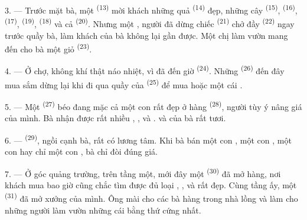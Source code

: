 3. --- Trước mặt bà, một  \textsuperscript{(13)} mời khách những quả
 \textsuperscript{(14)} đẹp, những cây 
\textsuperscript{(15)},  \textsuperscript{(16)}, 
\textsuperscript{(17)},  \textsuperscript{(19)}, 
\textsuperscript{(18)} và cả  \textsuperscript{(20)}. Nhưng một , người đã dừng chiếc  \textsuperscript{(21)} chở đầy
 \textsuperscript{(22)} ngay trước quầy bà, làm khách của bà không lại
gần được. Một chị làm vườn mang đến cho bà một giỏ 
\textsuperscript{(23)}.

\VUsaut{4.0mm}
\VUsaut{3.0mm}

4. --- Ở chợ, không khí thật náo nhiệt, vì đã đến giờ 
\textsuperscript{(24)}. Những  \textsuperscript{(26)} đến đây mua sắm
dừng lại khi đi qua quầy của  \textsuperscript{(25)} để mua
 hoặc một cái .

5. --- Một  \textsuperscript{(27)} béo đang mặc cả một con
 rất đẹp ở hàng  \textsuperscript{(28)}, người tùy ý
nâng giá của mình. Bà nhận được rất nhiều , ,
 và .  và  của bà rất tươi.

\VUsaut{4.0mm}
\VUsaut{3.0mm}

6. ---  \textsuperscript{(29)}, ngồi cạnh bà, rất có lương tâm.
Khi bà bán một con , một con , một con  hay chỉ
một con , bà chỉ đòi đúng giá.

7. --- Ở góc quảng trường, trên tầng một, mới đây một 
\textsuperscript{(30)} đã mở hàng, nơi khách mua bao giờ cũng chắc tìm được đủ loại
, ,  và  rất đẹp.
Cùng tầng ấy, một  \textsuperscript{(31)} đã mở xưởng của mình. Ông
mài  cho các bà hàng trong nhà lồng và làm cho những người làm vườn những
cái  bằng thứ  cứng nhất.

\VUsaut{4.0mm}
\VUsaut{3.0mm}

